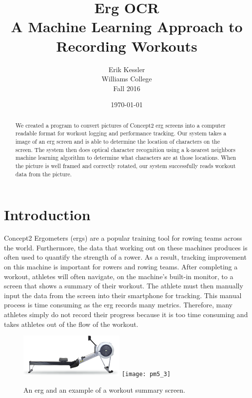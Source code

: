 \documentclass[a4paper,12pt]{article}
\newcommand{\projecttitle}{Erg OCR}
\newcommand{\projectsubtitle}{A Machine Learning Approach to Recording Workouts}
\begin{document}
\thispagestyle{plain}
\pagestyle{fancy}
\clearpage
\setlength{\headsep}{0.4in}


\title{Erg OCR\\ \large \projectsubtitle{}}
\date{\today}
\author{
  {\rm Erik Kessler}\\
  Williams College\\
  Fall 2016
}

\maketitle

\chead{\projecttitle}
\cfoot{\thepage}

\begin{abstract}
We created a program to convert pictures of Concept2 erg screens into a computer readable format for workout logging and performance tracking. Our system takes a image of an erg screen and is able to determine the location of characters on the screen. The system then does optical character recognition using a k-nearest neighbors machine learning algorithm to determine what characters are at those locations. When the picture is well framed and correctly rotated, our system successfully reads workout data from the picture.
\end{abstract}


\section{Introduction}
Concept2 Ergometers (ergs) are a popular training tool for rowing teams across the world. Furthermore, the data that working out on these machines produces is often used to quantify the strength of a rower. As a result, tracking improvement on this machine is important for rowers and rowing teams. After completing a workout, athletes will often navigate, on the machine\rq s built-in monitor, to a screen that shows a summary of their workout. The athlete must then manually input the data from the screen into their smartphone for tracking. This manual process is time consuming as the erg records many metrics. Therefore, many athletes simply do not record their progress because it is too time consuming and takes athletes out of the flow of the workout.

\begin{figure}[h]
    \centering
    \includegraphics[width=.35\textwidth]{erg}
    \texttt{[image: pm5\_3]}
    \caption{An erg and an example of a workout summary screen.}
    \label{fig:erg}
\end{figure}
\end{document}
